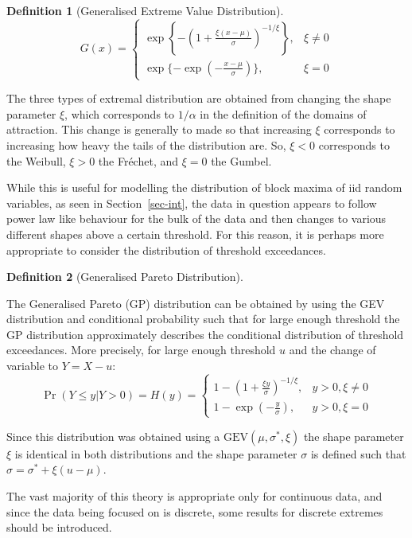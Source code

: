 \documentclass[
  10pt,
  a4paper,
]{scrreprt}
\theoremstyle{definition}
\newtheorem{definition}{Definition}[section]
\theoremstyle{plain}
\theoremstyle{remark}
\begin{document}
{\begin{definition}[Generalised Extreme Value
Distribution]
\[
G(x) = \begin{cases}\exp\left\{-\left(1+\frac{\xi(x-\mu)}{\sigma}\right)^{-1/\xi}\right\},&\xi\ne0\\
\exp\{-\exp(-\frac{x-\mu}{\sigma})\},&\xi=0
\end{cases}
\]

\end{definition}

The three types of extremal distribution are obtained from changing the
shape parameter \(\xi\), which corresponds to \(1/\alpha\) in the
definition of the domains of attraction. This change is generally to
made so that increasing \(\xi\) corresponds to increasing how heavy the
tails of the distribution are. So, \(\xi<0\) corresponds to the Weibull,
\(\xi>0\) the Fréchet, and \(\xi=0\) the Gumbel.

While this is useful for modelling the distribution of block maxima of
iid random variables, as seen in Section~\ref{sec-int}, the data in
question appears to follow power law like behaviour for the bulk of the
data and then changes to various different shapes above a certain
threshold. For this reason, it is perhaps more appropriate to consider
the distribution of threshold exceedances.

\begin{definition}[Generalised Pareto
Distribution]\protect\hypertarget{def-gp}{}\label{def-gp}

The Generalised Pareto (GP) distribution can be obtained by using the
GEV distribution and conditional probability such that for large enough
threshold the GP distribution approximately describes the conditional
distribution of threshold exceedances. More precisely, for large enough
threshold \(u\) and the change of variable to \(Y=X-u\): \[
\Pr(Y\le y | Y>0) = H(y) = \begin{cases}
1-\left(1+\frac{\xi y}{\sigma}\right)^{-1/\xi},&y>0,\xi\ne 0 \\
1-\exp\left(-\frac{y}{\sigma}\right),&y>0,\xi = 0
\end{cases}
\]

\end{definition}

Since this distribution was obtained using a
\(\text{GEV}(\mu,\sigma^*,\xi)\) the shape parameter \(\xi\) is
identical in both distributions and the shape parameter \(\sigma\) is
defined such that \(\sigma = \sigma^* + \xi(u-\mu)\).

The vast majority of this theory is appropriate only for continuous
data, and since the data being focused on is discrete, some results for
discrete extremes should be introduced.

}
\end{document}
